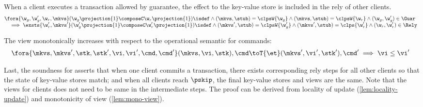\begin{lemma}
\label{lem:locality-update}
When a client executes a transaction allowed by guarantee, the effect to the key-value store is included in the rely of other clients.
\[
\begin{array}{@{}l}
    \fora{\w_g, \w_g', \w_r, \mkvs} (\w_g\projection{1} \composeC \w_r\projection{1} )\isdef \land (\mkvs, \stub) = \clpsW{\w_g} \land  (\mkvs, \stub) = \clpsW{\w_r} \land (\w_g, \w_g') \in \Guar  \\
    \quad \implies \exsts{\w_r', \mkvs'} (\w_g'\projection{1} \composeC \w_r'\projection{1})\isdef \land (\mkvs', \stub) = \clpsW{\w_g'} \land  (\mkvs', \stub) = \clps{\w_r'} \land (\w_r, \w_r') \in \Rely 
\end{array} 
\]
\end{lemma}

\begin{lemma}
\label{lem:mono-view}
The view monotonically increases with respect to the operational semantic for commands:
\[
    \begin{array}{@{}l}
        \fora{\mkvs, \mkvs', \stk, \stk', \vi, \vi', \cmd, \cmd'} (\mkvs, \vi, \stk), \cmd \toT{\et} (\mkvs', \vi', \stk'), \cmd' \implies \vi \leq \vi'
    \end{array}
\]
\end{lemma}

Last, the soundness for  asserts that when one client commits a transaction, there exists corresponding rely steps for all other clients so that the state of key-value stores match;
and when all clients reach \( \pskip \), the final key-value stores and views are the same.
Note that the views for clients does not need to be same in the intermediate steps.
The proof can be derived from locality of update (\cref{lem:locality-update}) and monotonicity of view (\cref{lem:mono-view}).

